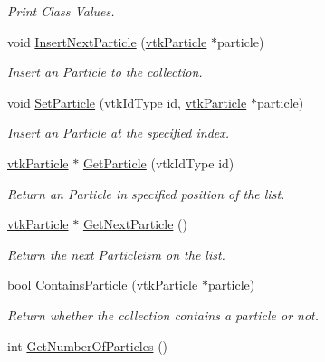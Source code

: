 \begin{DoxyCompactItemize}
\begin{DoxyCompactList}\small\item\em Print Class Values. \item\end{DoxyCompactList}\item 
void \hyperlink{classvtkParticleCollection_a72a443ca560badd2a938c7f1943bb7bd}{InsertNextParticle} (\hyperlink{classvtkParticle}{vtkParticle} $\ast$particle)
\begin{DoxyCompactList}\small\item\em Insert an Particle to the collection. \item\end{DoxyCompactList}\item 
void \hyperlink{classvtkParticleCollection_ace44cc49f9e3d14367d0c1bea12d13b3}{SetParticle} (vtkIdType id, \hyperlink{classvtkParticle}{vtkParticle} $\ast$particle)
\begin{DoxyCompactList}\small\item\em Insert an Particle at the specified index. \item\end{DoxyCompactList}\item 
\hyperlink{classvtkParticle}{vtkParticle} $\ast$ \hyperlink{classvtkParticleCollection_a5adda32ee7259d736e1b194a00a8aba6}{GetParticle} (vtkIdType id)
\begin{DoxyCompactList}\small\item\em Return an Particle in specified position of the list. \item\end{DoxyCompactList}\item 
\hyperlink{classvtkParticle}{vtkParticle} $\ast$ \hyperlink{classvtkParticleCollection_a9b9371fd750799c67b777509e80e82d3}{GetNextParticle} ()
\begin{DoxyCompactList}\small\item\em Return the next Particleism on the list. \item\end{DoxyCompactList}\item 
\hypertarget{classvtkParticleCollection_abc788d6d4e2803bd93a6c57fbfcb9545}{
bool \hyperlink{classvtkParticleCollection_abc788d6d4e2803bd93a6c57fbfcb9545}{ContainsParticle} (\hyperlink{classvtkParticle}{vtkParticle} $\ast$particle)}
\label{classvtkParticleCollection_abc788d6d4e2803bd93a6c57fbfcb9545}

\begin{DoxyCompactList}\small\item\em Return whether the collection contains a particle or not. \item\end{DoxyCompactList}\item 
\hypertarget{classvtkParticleCollection_a5f41b890d08137c6238f1777648939e8}{
int \hyperlink{classvtkParticleCollection_a5f41b890d08137c6238f1777648939e8}{GetNumberOfParticles} ()}
\label{classvtkParticleCollection_a5f41b890d08137c6238f1777648939e8}


\end{DoxyCompactItemize}
